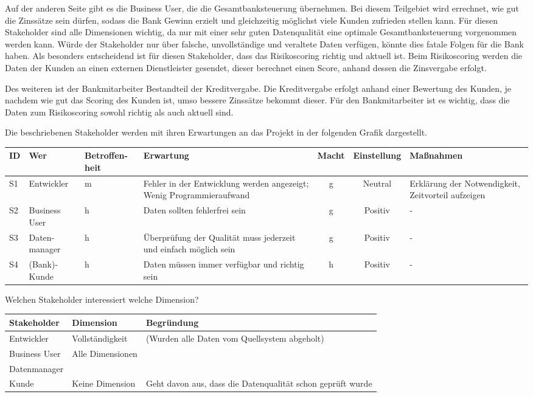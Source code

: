 Auf der anderen Seite gibt es die Business User, die die Gesamtbanksteuerung übernehmen.
Bei diesem Teilgebiet wird errechnet, wie gut die Zinssätze sein dürfen, sodass die Bank Gewinn erzielt und gleichzeitig möglichst viele Kunden zufrieden stellen kann.
Für diesen Stakeholder sind alle Dimensionen wichtig, da nur mit einer sehr guten Datenqualität eine optimale Gesamtbanksteuerung vorgenommen werden kann. 
Würde der Stakeholder nur über falsche, unvollständige und veraltete Daten verfügen, könnte dies fatale Folgen für die Bank haben.
Als besonders entscheidend ist für diesen Stakeholder, dass das Risikoscoring richtig und aktuell ist.
Beim Risikoscoring werden die Daten der Kunden an einen externen Dienstleister gesendet, dieser berechnet einen Score, anhand dessen die Zinsvergabe erfolgt.

Des weiteren ist der Bankmitarbeiter Bestandteil der Kreditvergabe. 
Die Kreditvergabe erfolgt anhand einer Bewertung des Kunden, je nachdem wie gut das Scoring des Kunden ist, umso bessere Zinssätze bekommt dieser.
Für den Bankmitarbeiter ist es wichtig, dass die Daten zum Risikoscoring sowohl richtig als auch aktuell sind.

Die beschriebenen Stakeholder werden mit ihren Erwartungen an das Projekt in der folgenden Grafik dargestellt.

\begin{tabular}[h]{l|p{2cm}|>{\centering}p{1.5cm}|p{2.5cm}|c|c|p{3cm}}
ID & Wer        & Betroffen-heit & Erwartung & Macht & Einstellung & Maßnahmen  \\ \hline
S1 & Entwickler & m             & Fehler in der Entwicklung werden angezeigt; Wenig Programmieraufwand & g & Neutral & Erklärung der Notwendigkeit, Zeitvorteil aufzeigen  \\ \hline
S2 & Business User & h          & Daten sollten fehlerfrei sein & g & Positiv & - \\ \hline
S3 & Daten-manager & h          & Überprüfung der Qualität muss jederzeit und einfach möglich sein & g & Positiv & - \\ \hline
S4 & (Bank)-Kunde & h          & Daten müssen immer verfügbar und richtig sein & h & Positiv & - \\
\end{tabular}


Welchen Stakeholder interessiert welche Dimension?

\begin{tabular}[h]{l|l|l}
Stakeholder & Dimension & Begründung \\ \hline
Entwickler & Vollständigkeit & (Wurden alle Daten vom Quellsystem abgeholt) \\ \hline
Business User & Alle Dimensionen & \\ \hline
Datenmanager & & \\ \hline
Kunde & Keine Dimension & Geht davon aus, dass die Datenqualität schon geprüft wurde \\
\end{tabular}


